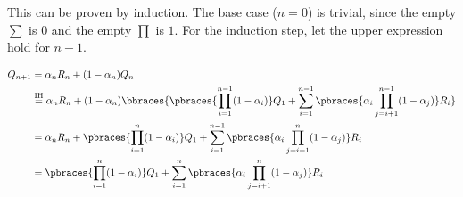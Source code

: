 \begin{solution}
This can be proven by induction.
The base case ($n = 0$) is trivial, since the empty $\sum$ is $0$ and the empty $\prod$ is $1$.
For the induction step, let the upper expression hold for $n-1$.

\begin{align*}
    Q_{n+1}
    & =
    \alpha_n R_n + (1 - \alpha_n) Q_n \\
    & \stackrel
    {
        \text{IH}
    }{=}
    \alpha_n R_n + (1 - \alpha_n)
    \bbraces
    {
        \pbraces
        {
            \prod_{i=1}^{n-1}
                (1 - \alpha_i)
        }
        Q_1
        +
        \sum_{i=1}^{n-1}
            \pbraces
            {
                \alpha_i
                \prod_{j=i+1}^{n-1}
                    (1 - \alpha_j)
            }
            R_i
    } \\
    & =
    \alpha_n R_n
    +
    \pbraces
    {
        \prod_{i=1}^n
            (1 - \alpha_i)
    }
    Q_1
    +
    \sum_{i=1}^{n-1}
        \pbraces
        {
            \alpha_i
            \prod_{j=i+1}^n
                (1 - \alpha_j)
        }
        R_i \\
    & =
    \pbraces
    {
        \prod_{i=1}^n
            (1 - \alpha_i)
    }
    Q_1
    +
    \sum_{i=1}^n
        \pbraces
        {
            \alpha_i
            \prod_{j=i+1}^n
                (1 - \alpha_j)
        }
        R_i
\end{align*}

\end{solution}

